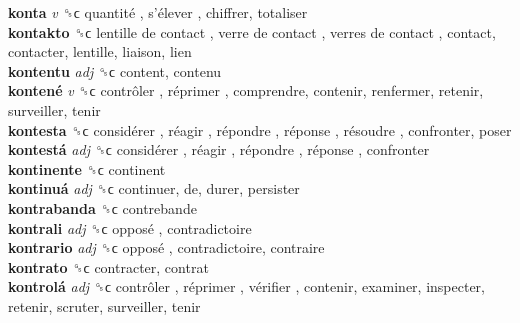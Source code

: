 \textbf{konta} \emph{v}  ␝ϲ   quantité ,  s’élever , chiffrer, totaliser  \\
\textbf{kontakto} ␝ϲ   lentille de contact ,  verre de contact ,  verres de contact , contact, contacter, lentille, liaison, lien  \\
\textbf{kontentu} \emph{adj}  ␝ϲ  content, contenu  \\
\textbf{kontené} \emph{v}  ␝ϲ   contrôler ,  réprimer , comprendre, contenir, renfermer, retenir, surveiller, tenir  \\
\textbf{kontesta} ␝ϲ   considérer ,  réagir ,  répondre ,  réponse ,  résoudre , confronter, poser  \\
\textbf{kontestá} \emph{adj}  ␝ϲ   considérer ,  réagir ,  répondre ,  réponse , confronter  \\
\textbf{kontinente} ␝ϲ  continent  \\
\textbf{kontinuá} \emph{adj}  ␝ϲ  continuer, de, durer, persister  \\
\textbf{kontrabanda} ␝ϲ  contrebande  \\
\textbf{kontrali} \emph{adj}  ␝ϲ   opposé , contradictoire  \\
\textbf{kontrario} \emph{adj}  ␝ϲ   opposé , contradictoire, contraire  \\
\textbf{kontrato} ␝ϲ  contracter, contrat  \\
\textbf{kontrolá} \emph{adj}  ␝ϲ   contrôler ,  réprimer ,  vérifier , contenir, examiner, inspecter, retenir, scruter, surveiller, tenir  \\
